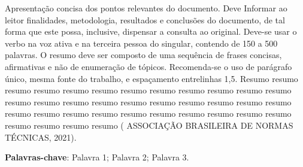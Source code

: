 \begin{resumo}
Apresentação concisa dos pontos relevantes do documento. Deve Informar ao leitor 
finalidades, metodologia, resultados e conclusões do documento, de tal forma que 
este possa, inclusive, dispensar a consulta ao original. Deve-se usar o verbo na voz 
ativa e na terceira pessoa do singular, contendo de 150 a 500 palavras. O resumo 
deve ser composto de uma sequência de frases concisas, afirmativas e não de 
enumeração de tópicos. Recomenda-se o uso de parágrafo único, mesma fonte do 
trabalho, e espaçamento entrelinhas 1,5. Resumo resumo resumo resumo resumo 
resumo resumo resumo resumo resumo resumo resumo resumo resumo resumo 
resumo resumo resumo resumo resumo resumo resumo resumo resumo resumo 
resumo resumo resumo resumo resumo resumo resumo resumo resumo resumo 
resumo ( ASSOCIAÇÃO BRASILEIRA DE NORMAS TÉCNICAS, 2021).
\vspace{\onelineskip}
\noindent

\textbf{Palavras-chave}: Palavra 1; Palavra 2; 
Palavra 3.
\end{resumo}

